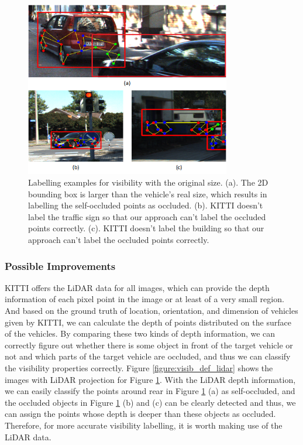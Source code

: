\documentclass[a4paper,12pt]{article}
\begin{document}
\begin{figure}[H]		
	\includegraphics[width=0.8\textwidth]{visib_def_3.png}
	\caption[Labelling examples for visibility with the original size.]{Labelling examples for visibility with the original size. (a). The 2D bounding box is larger than the vehicle's real size, which results in labelling the self-occluded points as occluded. (b). KITTI doesn't label the traffic sign so that our approach can't label the occluded points correctly. (c). KITTI doesn't label the building so that our approach can't label the occluded points correctly. }
	\centering
	\label{figure:visib_def}
\end{figure}


\subsubsection{Possible Improvements}

KITTI offers the LiDAR data for all images, which can provide the depth information of each pixel point in the image or at least of a very small region. And based on the ground truth of location, orientation, and dimension of vehicles given by KITTI, we can calculate the depth of points distributed on the surface of the vehicles. By comparing these two kinds of depth information, we can correctly figure out whether there is some object in front of the target vehicle or not and which parts of the target vehicle are occluded, and thus we can classify the visibility properties correctly. Figure \ref{figure:visib_def_lidar} shows the images with LiDAR projection for Figure \ref{figure:visib_def}. With the LiDAR depth information, we can easily classify the points around rear in Figure \ref{figure:visib_def} (a) as self-occluded, and the occluded objects in Figure \ref{figure:visib_def} (b) and (c) can be clearly detected and thus, we can assign the points whose depth is deeper than these objects as occluded. Therefore, for more accurate visibility labelling, it is worth making use of the LiDAR data.
\end{document}
